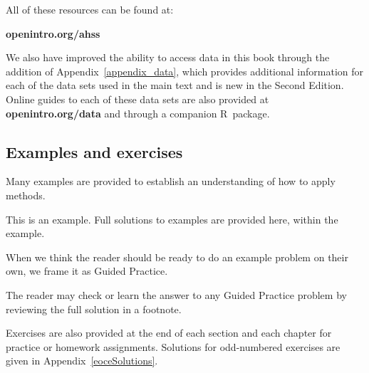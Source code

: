 \noindent%
All of these resources can be found at: 
\begin{center}
    {\color{black}\textbf{openintro.org/ahss}}
\end{center}

\noindent%
We also have improved the ability to access data in this book
through the addition of Appendix~\ref{appendix_data},
which provides additional information for each of the data sets
used in the main text and is new in the Second Edition.
Online guides to each of these data sets are also provided at
    {\color{black}\textbf{openintro.org/data}}
and through a
    {companion R~package}.

\vspace{3mm}

\subsection*{{\color{oiB}Examples and exercises}}

\noindent%
Many examples are provided to establish an understanding of how
to apply methods.

\begin{examplewrap}
\begin{nexample}{This is an example.}
  Full solutions to examples are provided here, within the example.
\end{nexample}
\end{examplewrap}

\noindent%
When we think the reader should be ready to do an example problem on their own, we frame it as Guided Practice.

\begin{exercisewrap}
\begin{nexercise}
The reader may check or learn the answer to any Guided Practice
problem by reviewing the full solution in a footnote.\footnotemark{}
\end{nexercise}
\end{exercisewrap}

\noindent%
Exercises are also provided at the end of each section
and each chapter for practice or homework assignments.  
Solutions for odd-numbered exercises are given in
Appendix~\ref{eoceSolutions}.

